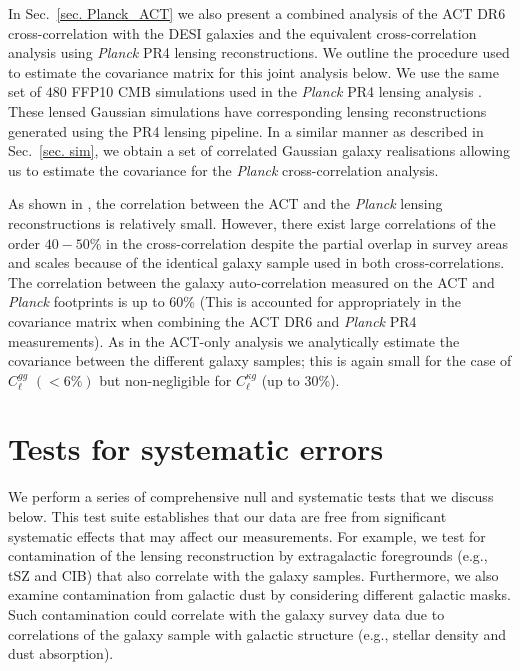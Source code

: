 \documentclass[twocolumn]{aastex631}
\begin{document}
{In Sec.~\ref{sec. Planck_ACT}  we also present a combined analysis of the ACT DR6 cross-correlation with the DESI galaxies and the equivalent cross-correlation analysis using \textit{Planck} PR4 lensing reconstructions. We outline the procedure used to estimate the covariance matrix for this joint analysis below.
We use the same set of $480$ FFP10 CMB simulations used in the \textit{Planck} PR4 lensing analysis \citep{Carron:2022}. These lensed Gaussian simulations  have corresponding lensing reconstructions generated using the PR4 lensing pipeline. In a similar manner as described in Sec.~\ref{sec. sim}, we obtain a set of correlated Gaussian galaxy realisations allowing us to estimate the covariance for the \textit{Planck} cross-correlation analysis.

As shown in \cite{qu2023atacama}, the correlation between the ACT and the \textit{Planck} lensing reconstructions is relatively small.  However, there exist large correlations of the order $40-50\%$ in the cross-correlation despite the partial overlap in survey areas and scales because of the identical galaxy sample used in both cross-correlations. The correlation between the galaxy auto-correlation measured on the ACT and \textit{Planck} footprints is up to $60\%$ (This is accounted for appropriately in the covariance matrix when combining the ACT DR6 and \textit{Planck} PR4 measurements). As in the ACT-only analysis we analytically estimate the covariance between the different galaxy samples; this is again small for the case of $C^{gg}_\ell$ $(<6\%)$ but non-negligible for $C^{\kappa{g}}_\ell$ (up to $30\%$).




\section{Tests for systematic errors}\label{sec.null}
We perform a series of comprehensive null and systematic tests that we discuss below. This test suite establishes that our data are free from significant systematic effects that may affect our measurements. For example, we test for contamination of the lensing reconstruction by extragalactic foregrounds (e.g., tSZ and CIB) that also correlate with the galaxy samples. Furthermore, we also examine contamination from galactic  dust by considering different galactic masks. Such contamination could correlate with the galaxy survey data due to correlations of the galaxy sample with galactic structure (e.g., stellar density and dust absorption).

}
\end{document}
